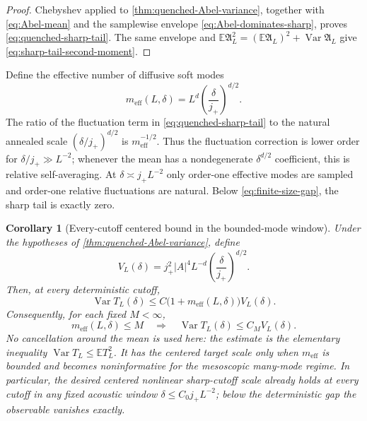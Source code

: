 \documentclass[11pt]{article}
\newtheorem{corollary}[theorem]{Corollary}
\theoremstyle{definition}
\theoremstyle{remark}
\newcommand{\E}{\mathbb E}
\newcommand{\Var}{\operatorname{Var}}
\newcommand{\abs}[1]{\left\lvert #1\right\rvert}
\begin{document}
\begin{proof}
Chebyshev applied to \cref{thm:quenched-Abel-variance}, together with
\eqref{eq:Abel-mean} and the samplewise envelope
\eqref{eq:Abel-dominates-sharp}, proves
\eqref{eq:quenched-sharp-tail}.  The same envelope and
$\E\mathfrak A_L^2=(\E\mathfrak A_L)^2+
\Var\mathfrak A_L$ give \eqref{eq:sharp-tail-second-moment}.
\end{proof}

Define the effective number of diffusive soft modes
\begin{equation}
 m_{\mathrm{eff}}(L,\delta)
 =L^d\left(\frac{\delta}{j_+}\right)^{d/2}.
 \label{eq:effective-mode-count}
\end{equation}
The ratio of the fluctuation term in \eqref{eq:quenched-sharp-tail} to the
natural annealed scale $(\delta/j_+)^{d/2}$ is
$m_{\mathrm{eff}}^{-1/2}$.  Thus the fluctuation correction is lower order
for $\delta/j_+\gg L^{-2}$; whenever the mean has a nondegenerate
$\delta^{d/2}$ coefficient, this is relative self-averaging.  At
$\delta\asymp j_+L^{-2}$ only order-one effective modes are sampled and
order-one relative fluctuations are natural.  Below
\eqref{eq:finite-size-gap}, the sharp tail is exactly zero.


\begin{corollary}[Every-cutoff centered bound in the bounded-mode window]
\label{cor:bounded-effective-mode-sharp-variance}
Under the hypotheses of \cref{thm:quenched-Abel-variance}, define
\begin{equation}
 V_L(\delta)=j_+^2\abs A^4L^{-d}
 \left(\frac{\delta}{j_+}\right)^{d/2}.
 \label{eq:sharp-target-variance-scale-early}
\end{equation}
Then, at every deterministic cutoff,
\begin{equation}
 \boxed{
 \Var T_L(\delta)
 \le C\bigl(1+m_{\mathrm{eff}}(L,\delta)\bigr)V_L(\delta).}
 \label{eq:bounded-mode-centered-bound}
\end{equation}
Consequently, for each fixed $M<\infty$,
\begin{equation}
 m_{\mathrm{eff}}(L,\delta)\le M
 \quad\Longrightarrow\quad
 \Var T_L(\delta)\le C_MV_L(\delta).
 \label{eq:bounded-mode-centered-target}
\end{equation}
No cancellation around the mean is used here: the estimate is the elementary inequality $\Var T_L\le\E T_L^2$.  It has the centered target scale only when $m_{\mathrm{eff}}$ is bounded and becomes noninformative for the mesoscopic many-mode regime.  In particular, the desired centered nonlinear sharp-cutoff scale already holds
at every cutoff in any fixed acoustic window
$\delta\le C_0j_+L^{-2}$; below the deterministic gap the observable vanishes
exactly.
\end{corollary}
\end{document}
